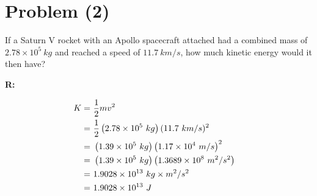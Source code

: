 \section{Problem (2)}

	If a Saturn V rocket with an Apollo spacecraft attached had a combined mass of $2.78 \times 10^{5} \ kg$ and reached a speed of $11.7 \ km/s$, how much kinetic energy would it then have?

	\textbf{R:}

	\begin{align}
		K = \ &\frac{1}{2}mv^{2}& \notag \\
		= \ &\frac{1}{2}\left(2.78 \times 10^{5} \ kg\right)(11.7 \ km/s)^{2}& \notag \\
		= \ &\left(1.39 \times 10^{5} \ kg\right)\left(1.17 \times 10^{4} \ m/s\right)^{2}& \notag \\
		= \ &\left(1.39 \times 10^{5} \ kg\right)\left(1.3689 \times 10^{8} \ m^{2}/s^{2} \right)& \notag \\
		= \ &1.9028 \times 10^{13} \ kg \times m^{2}/s^{2}& \notag \\
		= \ &1.9028 \times 10^{13} \ J&
	\end{align}
